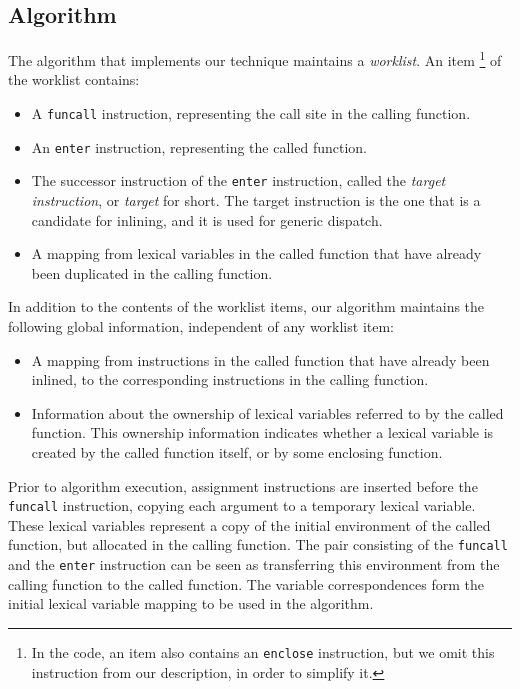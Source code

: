 \subsection{Algorithm}

The algorithm that implements our technique maintains a
\emph{worklist}.  An item%
\footnote{In the code, an item also contains an \texttt{enclose}
  instruction, but we omit this instruction from our description, in
  order to simplify it.}
of the worklist contains:

\begin{itemize}
\item A \texttt{funcall} instruction, representing the call site in the
  calling function.
\item An \texttt{enter} instruction, representing the called function.
\item The successor instruction of the \texttt{enter} instruction,
  called the \emph{target instruction}, or \emph{target} for short.
  The target instruction is the one that is a candidate for inlining, and it
  is used for generic dispatch.
\item A mapping from lexical variables in the called function that
  have already been duplicated in the calling function.
\end{itemize}

In addition to the contents of the worklist items, our algorithm
maintains the following global information, independent of any
worklist item:

\begin{itemize}
\item A mapping from instructions in the called function that have
  already been inlined, to the corresponding instructions in the
  calling function.
\item Information about the ownership of lexical variables referred to
  by the called function.  This ownership information indicates
  whether a lexical variable is created by the called function itself,
  or by some enclosing function.
\end{itemize}

Prior to algorithm execution, assignment instructions are inserted
before the \texttt{funcall} instruction, copying each argument to a
temporary lexical variable.  These lexical variables represent a copy
of the initial environment of the called function, but allocated in
the calling function.  The pair consisting of the \texttt{funcall} and
the \texttt{enter} instruction can be seen as transferring this
environment from the calling function to the called function.  The
variable correspondences form the initial lexical variable mapping to
be used in the algorithm.

